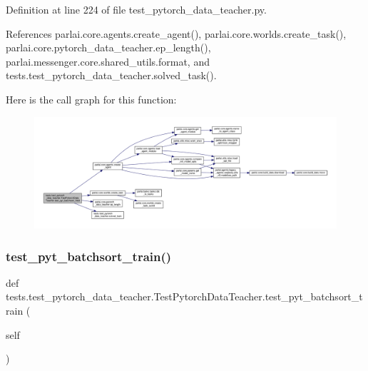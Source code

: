 Definition at line 224 of file test\+\_\+pytorch\+\_\+data\+\_\+teacher.\+py.



References parlai.\+core.\+agents.\+create\+\_\+agent(), parlai.\+core.\+worlds.\+create\+\_\+task(), parlai.\+core.\+pytorch\+\_\+data\+\_\+teacher.\+ep\+\_\+length(), parlai.\+messenger.\+core.\+shared\+\_\+utils.\+format, and tests.\+test\+\_\+pytorch\+\_\+data\+\_\+teacher.\+solved\+\_\+task().

Here is the call graph for this function\+:
\nopagebreak
\begin{figure}[H]
\begin{center}
\leavevmode
\includegraphics[width=350pt]{classtests_1_1test__pytorch__data__teacher_1_1TestPytorchDataTeacher_a1c96927436b550513d6656564ec0c5fe_cgraph}
\end{center}
\end{figure}
\mbox{\label{classtests_1_1test__pytorch__data__teacher_1_1TestPytorchDataTeacher_a17540e666ded187d76960e3ef3f43d7b}} 
\subsubsection{\texorpdfstring{test\+\_\+pyt\+\_\+batchsort\+\_\+train()}{test\_pyt\_batchsort\_train()}}
{\footnotesize\ttfamily def tests.\+test\+\_\+pytorch\+\_\+data\+\_\+teacher.\+Test\+Pytorch\+Data\+Teacher.\+test\+\_\+pyt\+\_\+batchsort\+\_\+train (\begin{DoxyParamCaption}\item[{}]{self }\end{DoxyParamCaption})}



